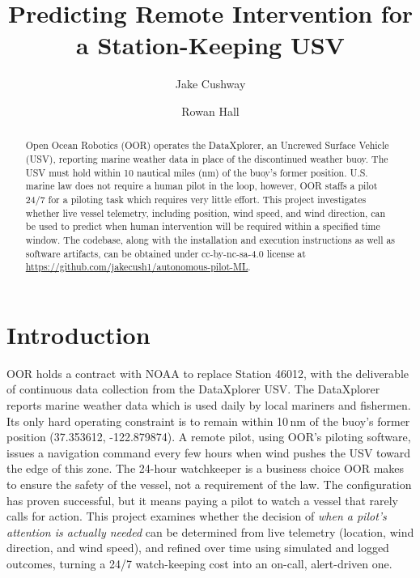 \documentclass[sigconf]{acmart}
\begin{document}
\title{Predicting Remote Intervention for a Station-Keeping USV}
\author{Jake Cushway}

\author{Rowan Hall}


\begin{abstract}
{Open Ocean Robotics (OOR) operates the DataXplorer, an Uncrewed Surface Vehicle (USV), reporting marine weather data in place of the discontinued weather buoy. The USV must hold within 10 nautical miles (nm) of the buoy's former position. U.S. marine law does not require a human pilot in the loop, however, OOR staffs a pilot 24/7 for a piloting task which requires very little effort.  This project investigates whether live vessel telemetry, including position, wind speed, and wind direction, can be used to predict when human intervention will be required within a specified time window.  The codebase, along with the installation and execution instructions as well as software artifacts, can be obtained under cc-by-nc-sa-4.0 license at \url{https://github.com/jakecush1/autonomous-pilot-ML}.}
\end{abstract}


\maketitle 
\section{Introduction}
{OOR holds a contract with NOAA to replace Station 46012, with the deliverable of
continuous data collection from the DataXplorer USV. The DataXplorer reports
marine weather data which is used daily by local mariners and fishermen.  Its only hard operating constraint is to remain within 10\,nm of the buoy's former
position (37.353612, -122.879874). A remote pilot, using OOR's piloting
software, issues a navigation command every few hours when wind pushes the USV
toward the edge of this zone. The 24-hour watchkeeper is a business choice OOR
makes to ensure the safety of the vessel, not a requirement of the law.
The configuration has proven successful, but it means paying a pilot to watch a
vessel that rarely calls for action. This project examines whether the decision
of \textit{when a pilot's attention is actually needed} can be determined from
live telemetry (location, wind direction, and wind speed), and refined over time using simulated and logged outcomes, turning a 24/7 watch-keeping cost into an on-call, alert-driven one.}
\end{document}
